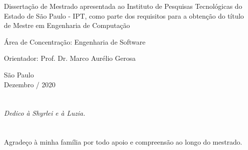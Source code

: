\documentclass[12pt,oneside,a4paper]{book} %
\begin{document}
    \vskip 2cm

    \hspace{6cm}\begin{minipage}{0.48\linewidth}
	Dissertação de Mestrado apresentada
	ao Instituto de Pesquisas Tecnológicas do\\
	Estado de São Paulo - IPT, como 
	parte dos requisitos para a obtenção do 
	título de Mestre em Engenharia de 
	Computação
    \end{minipage}
    
    \vskip 2cm
    
    \hspace{6cm}\begin{minipage}{0.48\linewidth}
	Área de Concentração: Engenharia de Software
    \end{minipage}
    
    \vskip 2cm
    
    \hspace{6cm}\begin{minipage}{0.48\linewidth}
	Orientador: Prof. Dr. Marco Aurélio Gerosa
    \end{minipage}
    
    \vskip 6cm
    
    \begin{center}
        São Paulo\\
        
        Dezembro / 2020
    \end{center}

\pagebreak




\chapter*{}
\thispagestyle{empty}
\begin{center}
    \textit{Dedico à Shyrlei e à Luzia.}
\end{center}



\chapter*{}
\thispagestyle{empty}
Agradeço à minha família por todo apoio e compreensão ao longo do mestrado.
\\
\end{document}
